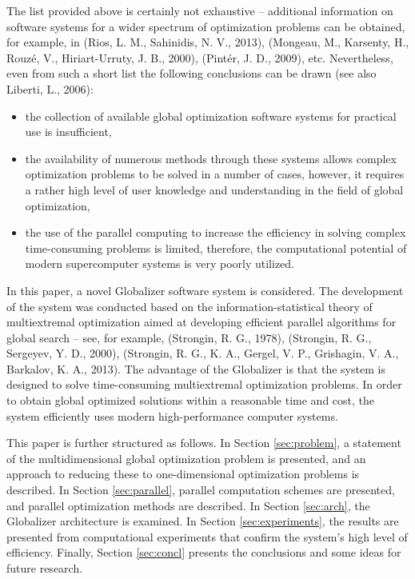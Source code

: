 \documentclass{gOMS2e}
\theoremstyle{plain}%
\theoremstyle{definition}
\theoremstyle{remark}
\begin{document}
\par
The list provided above is certainly not exhaustive – additional information on software
systems for a wider spectrum of optimization problems can be obtained, for example,
in (Rios, L. M., Sahinidis, N. V., 2013), (Mongeau, M.,  Karsenty, H., Rouzé, V., Hiriart-Urruty, J. B., 2000), (Pintér, J. D., 2009), etc.
Nevertheless, even from such a short list the following conclusions can be drawn (see also Liberti, L., 2006):
\begin{itemize}
\item  the collection of available global optimization software systems for practical use is insufficient,
\item the availability of numerous methods through these systems allows complex
optimization problems to be solved in a number of cases, however, it requires a rather
high level of user knowledge and understanding in the field of global optimization,
\item the use of the parallel computing to increase the efficiency in solving complex
time-consuming problems is limited, therefore, the computational potential of modern
supercomputer systems is very poorly utilized.
\end{itemize}
\par
In this paper, a novel Globalizer software system is considered. The development of the
system was conducted based on the information-statistical theory of multiextremal
optimization aimed at developing efficient parallel algorithms for global search – see, for example, (Strongin, R. G., 1978), (Strongin, R. G., Sergeyev, Y. D., 2000), (Strongin, R. G., K. A., Gergel, V. P., Grishagin, V. A., Barkalov, K. A., 2013).
The advantage of the Globalizer is that the system is designed to solve time-consuming
multiextremal optimization problems. In order to obtain global optimized solutions
within a reasonable time and cost, the system efficiently uses modern high-performance computer systems.
\par
This paper is further structured as follows. In Section \ref{sec:problem}, a statement of the multidimensional
global optimization problem is presented, and an approach to reducing these to one-dimensional
optimization problems is described. In Section \ref{sec:parallel}, parallel computation schemes are presented,
and parallel optimization methods are described. In Section \ref{sec:arch}, the Globalizer architecture
is examined. In Section \ref{sec:experiments}, the results are presented from computational experiments
that confirm the system’s high level of efficiency. Finally, Section \ref{sec:concl} presents the
conclusions and some ideas for future research.
\end{document}
